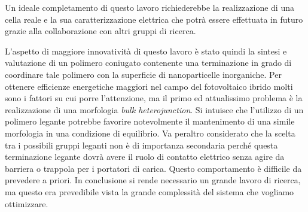 Un ideale completamento di questo lavoro richiederebbe la realizzazione di una cella reale e la sua caratterizzazione elettrica {
che potrà essere effettuata in futuro grazie alla collaborazione con altri gruppi di ricerca.} 

{L'aspetto di maggiore innovatività di questo lavoro è stato quindi la sintesi e valutazione di un polimero coniugato contenente una terminazione in grado di coordinare tale polimero con la superficie 
di nanoparticelle inorganiche. Per ottenere efficienze energetiche maggiori nel campo del fotovoltaico ibrido molti sono i fattori su cui porre l'attenzione, ma il primo ed attualissimo problema è la realizzazione di una morfologia \emph{bulk heterojunction}. Si intuisce che l'utilizzo di un polimero legante potrebbe favorire notevolmente il mantenimento di una simile morfologia in una condizione di equilibrio. Va peraltro considerato che la scelta tra i possibili gruppi leganti non è di importanza secondaria perché questa terminazione legante dovrà avere il ruolo di contatto elettrico senza agire da barriera o trappola per i portatori di carica. Questo comportamento è difficile da prevedere a priori. In conclusione si rende necessario un grande lavoro di ricerca, ma questo era prevedibile vista la grande complessità del sistema che vogliamo ottimizzare.
}

